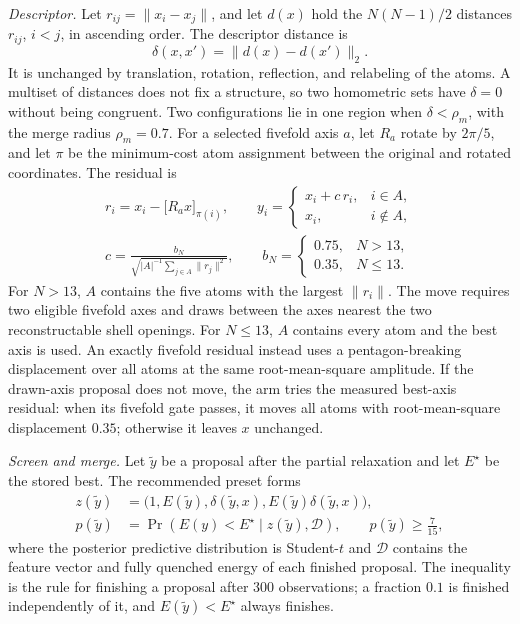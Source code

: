 \documentclass[journal=jctcce,manuscript=suppinfo]{achemso}
\begin{document}
\emph{Descriptor.}
Let \(r_{ij}=\lVert x_i-x_j\rVert\), and let \(d(x)\) hold the
\(N(N-1)/2\) distances \(r_{ij}\), \(i<j\), in ascending order.
The descriptor distance is
\begin{equation}
\delta(x,x') = \lVert d(x)-d(x')\rVert_2 .
\label{eq:descriptor}
\end{equation}
It is unchanged by translation, rotation, reflection, and relabeling of the
atoms.
A multiset of distances does not fix a structure, so two homometric sets have
\(\delta=0\) without being congruent.
Two configurations lie in one region when \(\delta<\rho_m\), with the merge
radius \(\rho_m=0.7\).
For a selected fivefold axis \(a\), let \(R_a\) rotate by \(2\pi/5\), and
let \(\pi\) be the minimum-cost atom assignment between the original and
rotated coordinates.
The residual is
\begin{equation}
\begin{gathered}
r_i=x_i-\bigl[R_a x\bigr]_{\pi(i)},\qquad
y_i =
\begin{cases}
x_i+c\,r_i,&i\in A,\\
x_i,&i\notin A,
\end{cases}\\
c=\frac{b_N}{\sqrt{|A|^{-1}\sum_{j\in A}\lVert r_j\rVert^2}},
\qquad
b_N=\begin{cases}0.75,&N>13,\\0.35,&N\leq13.\end{cases}
\end{gathered}
\label{eq:soap-step}
\end{equation}
For \(N>13\), \(A\) contains the five atoms with the largest
\(\lVert r_i\rVert\).
The move requires two eligible fivefold axes and draws between the axes
nearest the two reconstructable shell openings.
For \(N\leq13\), \(A\) contains every atom and the best axis is
used.
An exactly fivefold residual instead uses a pentagon-breaking displacement
over all atoms at the same root-mean-square amplitude.
If the drawn-axis proposal does not move, the arm tries the measured
best-axis residual: when its fivefold gate passes, it moves all atoms with
root-mean-square displacement \(0.35\); otherwise it leaves \(x\) unchanged.

\emph{Screen and merge.}
Let \(\tilde y\) be a proposal after the partial relaxation and let
\(E^\star\) be the stored best.
The recommended preset forms
\begin{equation}
\begin{aligned}
z(\tilde y)&=\bigl(1,E(\tilde y),\delta(\tilde y,x),
E(\tilde y)\delta(\tilde y,x)\bigr),\\
p(\tilde y)&=\Pr\!\left(E(y)<E^\star\mid z(\tilde y),\mathcal D\right),
\qquad p(\tilde y)\geq\frac{7}{15},
\end{aligned}
\label{eq:bayes-screen}
\end{equation}
where the posterior predictive distribution is Student-\(t\) and
\(\mathcal D\) contains the feature vector and fully quenched energy of each
finished proposal.
The inequality is the rule for finishing a proposal after 300 observations;
a fraction \(0.1\) is finished independently of it, and
\(E(\tilde y)<E^\star\) always finishes.
\end{document}
